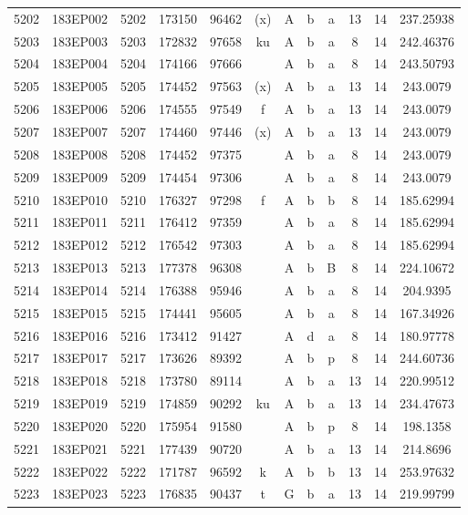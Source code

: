 \begin{tabular}{|*{12}{c|}}
5202 & 183EP002 & 5202 & 173150 & 96462 & (x) & A & b & a & 13 & 14 & 237.25938 \\ 
5203 & 183EP003 & 5203 & 172832 & 97658 & ku & A & b & a & 8 & 14 & 242.46376 \\ 
5204 & 183EP004 & 5204 & 174166 & 97666 &  & A & b & a & 8 & 14 & 243.50793 \\ 
5205 & 183EP005 & 5205 & 174452 & 97563 & (x) & A & b & a & 13 & 14 & 243.0079 \\ 
5206 & 183EP006 & 5206 & 174555 & 97549 & f & A & b & a & 13 & 14 & 243.0079 \\ 
5207 & 183EP007 & 5207 & 174460 & 97446 & (x) & A & b & a & 13 & 14 & 243.0079 \\ 
5208 & 183EP008 & 5208 & 174452 & 97375 &  & A & b & a & 8 & 14 & 243.0079 \\ 
5209 & 183EP009 & 5209 & 174454 & 97306 &  & A & b & a & 8 & 14 & 243.0079 \\ 
5210 & 183EP010 & 5210 & 176327 & 97298 & f & A & b & b & 8 & 14 & 185.62994 \\ 
5211 & 183EP011 & 5211 & 176412 & 97359 &  & A & b & a & 8 & 14 & 185.62994 \\ 
5212 & 183EP012 & 5212 & 176542 & 97303 &  & A & b & a & 8 & 14 & 185.62994 \\ 
5213 & 183EP013 & 5213 & 177378 & 96308 &  & A & b & B & 8 & 14 & 224.10672 \\ 
5214 & 183EP014 & 5214 & 176388 & 95946 &  & A & b & a & 8 & 14 & 204.9395 \\ 
5215 & 183EP015 & 5215 & 174441 & 95605 &  & A & b & a & 8 & 14 & 167.34926 \\ 
5216 & 183EP016 & 5216 & 173412 & 91427 &  & A & d & a & 8 & 14 & 180.97778 \\ 
5217 & 183EP017 & 5217 & 173626 & 89392 &  & A & b & p & 8 & 14 & 244.60736 \\ 
5218 & 183EP018 & 5218 & 173780 & 89114 &  & A & b & a & 13 & 14 & 220.99512 \\ 
5219 & 183EP019 & 5219 & 174859 & 90292 & ku & A & b & a & 13 & 14 & 234.47673 \\ 
5220 & 183EP020 & 5220 & 175954 & 91580 &  & A & b & p & 8 & 14 & 198.1358 \\ 
5221 & 183EP021 & 5221 & 177439 & 90720 &  & A & b & a & 13 & 14 & 214.8696 \\ 
5222 & 183EP022 & 5222 & 171787 & 96592 & k & A & b & b & 13 & 14 & 253.97632 \\ 
5223 & 183EP023 & 5223 & 176835 & 90437 & t & G & b & a & 13 & 14 & 219.99799 \\ 

\end{tabular}
